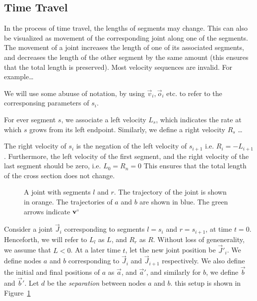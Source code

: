 \subsection{Time Travel}
\label{sec:time_travel}

In the process of time travel, the lengths of segments may change.
This can also be visualized as movement of the corresponding joint along one of the segments.
The movement of a joint increases the length of one of its associated segments,
and decreases the length of the other segment by the same amount (this ensures that the total length is preserved).
Most velocity sequences are invalid. For example\ldots

We will use some abuuse of notation, by using $\vec v_i, \vec o_i$ etc.
to refer to the corresponsing parameters of $s_i$.

\begin{definition}
\label{def:segment_length}
For ever segment $s$, we associate a left velocity $L_s$,
which indicates the rate at which $s$ grows from its left endpoint.
Similarly, we define a right velocity $R_s$ \ldots
\end{definition}

\begin{claim}
\label{clm:left_right_velocity}
The right velocity of $s_{i}$ is the negation of the left velocity of $s_{i+1}$ i.e. $R_i = -L_{i+1}$.
Furthermore, the left velocity of the first segment,
and the right velocity of the last segment should be zero, i.e. $L_0 = R_n = 0$
This ensures that the total length of the cross section does not change.
\end{claim}

\begin{figure}[htpb]
\graphicspath{{./notebooks/}}
    \centering
    \def\svgwidth{0.7\textwidth}
    
    \caption{A joint with segments $l$ and $r$.
    The trajectory of the joint is shown in orange.
    The trajectories of $a$ and $b$ are shown in blue.
    The green arrows indicate $\vec v^\shortparallel$}
    \label{fig:joint_plane_velocity}
\end{figure}

Consider a joint $\vec J_i$ corresponding to segments $l = s_i$ and $r = s_{i+1}$, at time $t=0$.
Henceforth, we will refer to $L_l$ as $L$, and $R_r$ as $R$.
Without loss of genenerality, we assume that $L<0$.
At a later time $t$, let the new joint position be $\vec J'_i$.
We define nodes $a$ and $b$ corresponding to $\vec J_i$ and $\vec J_{i+1}$ respectively.
We also define the initial and final positions of $a$ as $\vec a$,
and $\vec a'$, and similarly for $b$, we define $\vec b$ and $\vec b'$.
Let $d$ be the \emph{separation} between nodes $a$ and $b$.
this setup is shown in Figure~\ref{fig:joint_plane_velocity}

